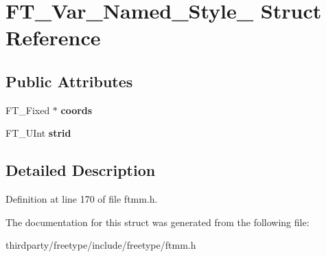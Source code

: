 \hypertarget{struct_f_t___var___named___style__}{}\section{F\+T\+\_\+\+Var\+\_\+\+Named\+\_\+\+Style\+\_\+ Struct Reference}
\label{struct_f_t___var___named___style__}
\subsection*{Public Attributes}
\begin{DoxyCompactItemize}
\item 
\mbox{\label{struct_f_t___var___named___style___a07195d55aee541db651ef3a8b04bb41f}} 
F\+T\+\_\+\+Fixed $\ast$ {\bfseries coords}
\item 
\mbox{\label{struct_f_t___var___named___style___a7802f6958c6e883bdce16b9931002826}} 
F\+T\+\_\+\+U\+Int {\bfseries strid}
\end{DoxyCompactItemize}


\subsection{Detailed Description}


Definition at line 170 of file ftmm.\+h.



The documentation for this struct was generated from the following file\+:\begin{DoxyCompactItemize}
\item 
thirdparty/freetype/include/freetype/ftmm.\+h\end{DoxyCompactItemize}
